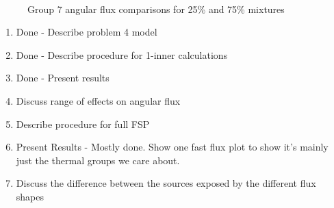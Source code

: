 \begin{figure}[h]
    \centering
    ~
    ~
    \caption{Group 7 angular flux comparisons for 25\% and 75\% mixtures}\label{f:1dmoc-angflux7}
\end{figure}

\begin{enumerate}[leftmargin=*]
  \item Done - Describe problem 4 model
  \item Done - Describe procedure for 1-inner calculations
  \item Done - Present results
  \item Discuss range of effects on angular flux
  \item Describe procedure for full FSP
  \item Present Results - Mostly done.  Show one fast flux plot to show it's mainly just the thermal groups we care about.
  \item Discuss the difference between the sources exposed by the different flux shapes
\end{enumerate} 

